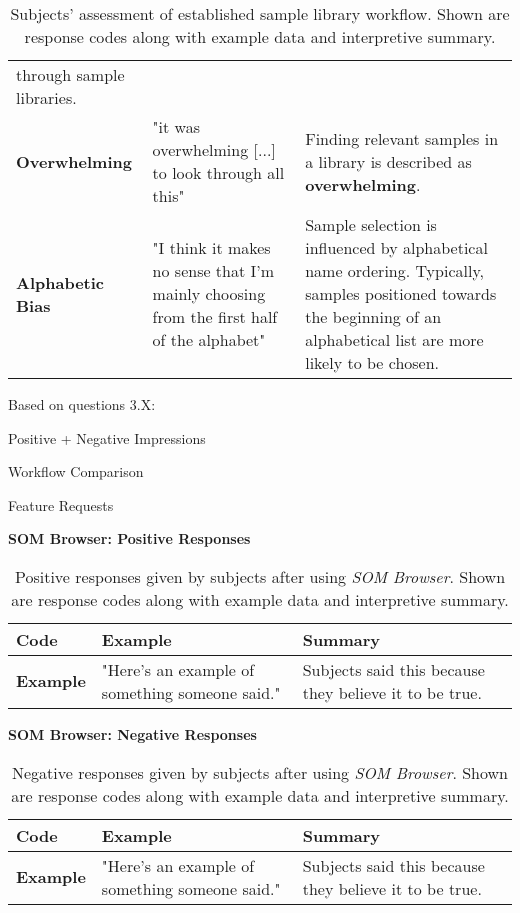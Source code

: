 \begin{table}[!ht]
\begin{tabular}{ p{4.0cm} p{4.75cm} p{4.75cm} }
    through sample libraries.
    \\
    \textbf{Overwhelming}
    &
    "it was overwhelming [...] to look through all this"
    &
    Finding relevant samples in a library is described as \textbf{overwhelming}.
    \\
    \textbf{Alphabetic Bias}
    &
    "I think it makes no sense that I'm mainly choosing from the first half of
    the alphabet"
    &
    Sample selection is influenced by alphabetical name ordering. Typically,
    samples positioned towards the beginning of an alphabetical list are more
    likely to be chosen.
    \\
  \end{tabular}
  \caption[Established Sample Library Workflow Assessment: Response Codes]
  {Subjects' assessment of established sample library workflow. Shown are
  response codes along with example data and interpretive summary.}
  \label{table:current_workflow_assessment}
\end{table}

Based on questions 3.X:

Positive + Negative Impressions

Workflow Comparison

Feature Requests

\begin{table}[!ht]
  \textbf{SOM Browser: Positive Responses}
  \renewcommand{\arraystretch}{1.2}
  \centering
  \footnotesize
  \begin{tabular}{ p{4.0cm} p{4.75cm} p{4.75cm} }
  \hline
    \textbf{Code} & \textbf{Example} & \textbf{Summary} \\
    \hline
    \textbf{Example}
    &
    "Here's an example of something someone said."
    &
    Subjects said this because they believe it to be true.
    \\
  \end{tabular}
  \caption[\textit{SOM Browser}: Positive Responses]{Positive responses given
  by subjects after using \textit{SOM Browser}. Shown are response codes along
  with example data and interpretive summary.}
  \label{table:responses_som-browser_positive}
\end{table}

\begin{table}[!ht]
  \textbf{SOM Browser: Negative Responses}
  \renewcommand{\arraystretch}{1.2}
  \centering
  \footnotesize
  \begin{tabular}{ p{4.0cm} p{4.75cm} p{4.75cm} }
  \hline
    \textbf{Code} & \textbf{Example} & \textbf{Summary} \\
    \hline
    \textbf{Example}
    &
    "Here's an example of something someone said."
    &
    Subjects said this because they believe it to be true.
    \\
  \end{tabular}
  \caption[\textit{SOM Browser}: Negative Responses]{Negative responses given
  by subjects after using \textit{SOM Browser}. Shown are response codes along
  with example data and interpretive summary.}
  \label{table:responses_som-browser_negative}
\end{table}

